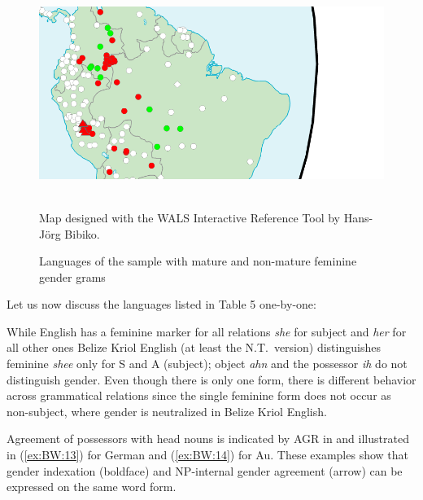 \documentclass[output=collectionpaper]{langsci/langscibook}
\begin{document}
\begin{figure}
\begin{minipage}[t]{0.3\textwidth}
\includegraphics[width=\textwidth]{figures/12/12-fig1c.png}
\end{minipage}\\
{\small Map designed with the WALS Interactive Reference Tool by Hans-Jörg Bibiko.}
\caption{Languages of the sample with mature and non-mature feminine gender grams}
\label{fig:BW:1}
\end{figure}

Let us now discuss the languages listed in Table 5 one-by-one:

While English has a feminine marker for all relations \textendash{} \textit{she} for subject and \textit{her} for all other ones \textendash{} Belize Kriol English (at least the N.T.\ version) distinguishes feminine \textit{shee} only for S and A (subject); object \textit{ahn} and the possessor \textit{ih} do not distinguish gender. Even though there is only one form, there is different behavior across grammatical relations since the single feminine form does not occur as non-subject, where gender is neutralized in Belize Kriol English.

Agreement of possessors with head nouns is indicated by AGR in  and illustrated in (\ref{ex:BW:13}) for German and (\ref{ex:BW:14}) for Au. These examples show that gender indexation (boldface) and NP-internal gender agreement (arrow) can be expressed on the same word form.

%
\end{document}
